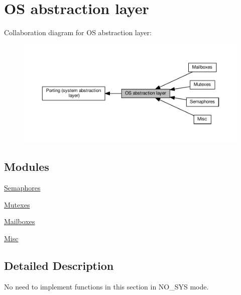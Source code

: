 \hypertarget{group__sys__os}{}\section{OS abstraction layer}
\label{group__sys__os}
Collaboration diagram for OS abstraction layer\+:
\nopagebreak
\begin{figure}[H]
\begin{center}
\leavevmode
\includegraphics[width=350pt]{group__sys__os}
\end{center}
\end{figure}
\subsection*{Modules}
\begin{DoxyCompactItemize}
\item 
\hyperlink{group__sys__sem}{Semaphores}
\item 
\hyperlink{group__sys__mutex}{Mutexes}
\item 
\hyperlink{group__sys__mbox}{Mailboxes}
\item 
\hyperlink{group__sys__misc}{Misc}
\end{DoxyCompactItemize}


\subsection{Detailed Description}
No need to implement functions in this section in N\+O\+\_\+\+S\+YS mode. 